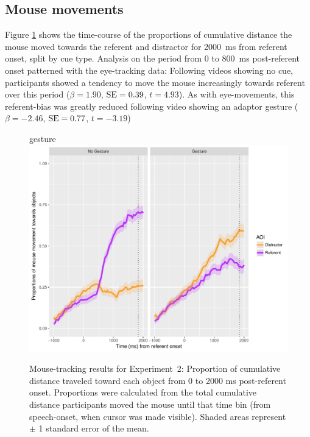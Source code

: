 \documentclass[a4paper,man,natbib]{apa6}
\newcommand{\resultsLM}[3]{$\beta = #1$, $\textnormal{SE} = #2$, $t #3$}
\begin{document}
\subsection{Mouse movements}
Figure \ref{fig:v2_mouse} shows the time-course of the proportions of cumulative distance the mouse moved towards the referent and distractor for 2000~ms from referent onset, split by cue type.
Analysis on the period from 0 to 800~ms post-referent onset patterned with the eye-tracking data:
Following videos showing no cue, participants showed a tendency to move the mouse increasingly towards referent over this period (\resultsLM{1.90}{0.39}{=4.93}).
As with eye-movements, this referent-bias was greatly reduced following video showing an adaptor gesture (\resultsLM{-2.46}{0.77}{=-3.19})

\begin{figure}[Ht]gesture
  \centering
	\includegraphics[width=\linewidth]{./img/e8_mouset.pdf}
  \caption{Mouse-tracking results for Experiment~2: Proportion of cumulative distance traveled toward each object from 0 to 2000 ms post-referent onset. Proportions were calculated from the total cumulative distance participants moved the mouse until that time bin (from speech-onset, when cursor was made visible). Shaded areas represent $\pm$ 1 standard error of the mean.}
  \label{fig:v2_mouse}
\end{figure}



\end{document}
